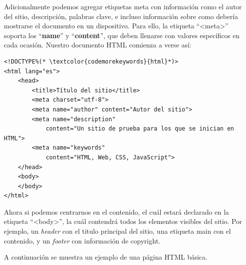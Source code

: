 Adicionalmente podemos agregar etiquetas meta con información como el autor del
sitio, descripción, palabras clave, e incluso información sobre como debería
mostrarse el documento en un dispositivo. Para ello, la etiqueta ``<meta>''
soporta los ``\textbf{name}'' y ``\textbf{content}'', que deben llenarse con
valores específicos en cada ocasión. Nuestro documento HTML comienza a verse así:

\begin{lstlisting}[language=XHTML]
<!DOCTYPE%(* \textcolor{codemorekeywords}{html}*)>
<html lang="es">
    <head>
        <title>Título del sitio</title>
        <meta charset="utf-8">
        <meta name="author" content="Autor del sitio">
        <meta name="description"
            content="Un sitio de prueba para los que se inician en HTML">
        <meta name="keywords"
            content="HTML, Web, CSS, JavaScript">
    </head>
    <body>
    </body>
</html>
\end{lstlisting}

Ahora si podemos centrarnos en el contenido, el cuál estará declarado en la
etiqueta ``<body>'', la cuál contendrá todos los elementos visibles del sitio.
Por ejemplo, un \textit{header} con el titulo principal del sitio, una etiqueta main con
el contenido, y un \textit{footer} con información de copyright.

A continuación se muestra un ejemplo de una página HTML básica.

